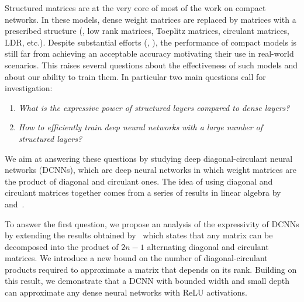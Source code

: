 Structured matrices are at the very core of most of the work on compact networks.
In these models, dense weight matrices are replaced by matrices with a prescribed structure (\eg, low rank matrices, Toeplitz matrices, circulant matrices, LDR, etc.).
Despite substantial efforts  (\eg, \citet{cheng2015exploration,moczulski2016acdc}), the performance of compact models is still far from achieving an acceptable accuracy motivating their use in real-world scenarios.
This raises several questions about the effectiveness of such models and about our ability to train them.
In particular two main questions call for investigation:
\begin{enumerate}
    \item \emph{What is the expressive power of structured layers compared to dense layers?}
    \item \emph{How to efficiently train deep neural networks with a large number of structured layers?}
\end{enumerate}
We aim at answering these questions by studying deep diagonal-circulant neural networks (\aka DCNNs), which are deep neural networks in which weight matrices are the product of diagonal and circulant ones.
The idea of using diagonal and circulant matrices together comes from a series of results in linear algebra by~\citet{muller1998algorithmic} and~\citet{huhtanen2015factoring}.

To answer the first question, we propose an analysis of the expressivity of DCNNs by extending the results obtained by~\citet{huhtanen2015factoring} which states that any matrix can be decomposed into the product of $2n-1$ alternating diagonal and circulant matrices.
We introduce a new bound on the number of diagonal-circulant products required to approximate a matrix that depends on its rank.
Building on this result, we demonstrate that a DCNN with bounded width and small depth can approximate any dense neural networks with ReLU activations. 

